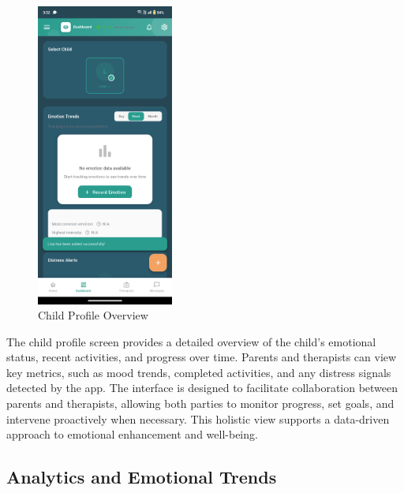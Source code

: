 \documentclass[12pt,a4paper]{article}
\newcommand{\sectiontitle}[1]{\subsection{#1}}
\begin{document}
\begin{figure}[H]
    \centering
    \includegraphics[width=0.4\textwidth]{Screenshots/childprofile.png}
    \caption{Child Profile Overview}
    \label{fig:child-profile}
\end{figure}
The child profile screen provides a detailed overview of the child's emotional status, recent activities, and progress over time. Parents and therapists can view key metrics, such as mood trends, completed activities, and any distress signals detected by the app. The interface is designed to facilitate collaboration between parents and therapists, allowing both parties to monitor progress, set goals, and intervene proactively when necessary. This holistic view supports a data-driven approach to emotional enhancement and well-being.

\sectiontitle{Analytics and Emotional Trends}
\end{document}
